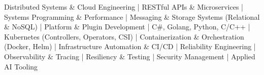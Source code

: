 Distributed Systems \& Cloud Engineering | RESTful APIs \& Microservices | Systems Programming \& Performance | Messaging \& Storage Systems (Relational \& NoSQL) | Platform \& Plugin Development | C\#, Golang, Python, C/C++ | Kubernetes (Controllers, Operators, CSI) | Containerization \& Orchestration (Docker, Helm) | Infrastructure Automation \& CI/CD | Reliability Engineering | Observability \& Tracing | Resiliency \& Testing | Security Management | Applied AI Tooling

